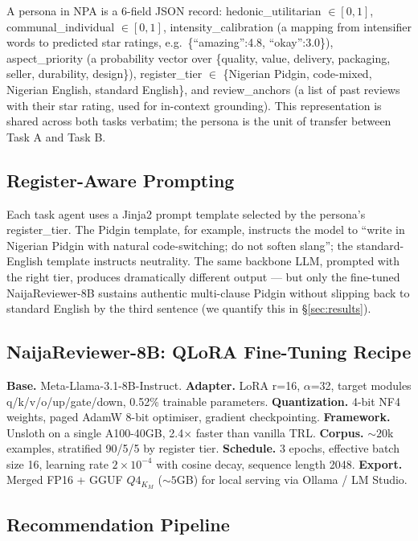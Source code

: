 \documentclass[sigconf,nonacm,balance]{acmart}
\begin{document}
A persona in NPA is a 6-field JSON record:
\textsf{hedonic\_utilitarian} \(\in [0,1]\),
\textsf{communal\_individual} \(\in [0,1]\),
\textsf{intensity\_calibration} (a mapping from intensifier words to predicted
star ratings, e.g.\ \textsf{\{``amazing'':4.8, ``okay'':3.0\}}),
\textsf{aspect\_priority} (a probability vector over
\{quality, value, delivery, packaging, seller, durability, design\}),
\textsf{register\_tier} \(\in\) \{Nigerian Pidgin, code-mixed,
Nigerian English, standard English\}, and
\textsf{review\_anchors} (a list of past reviews with their star rating, used
for in-context grounding).  This representation is shared across both tasks
verbatim; the persona is the unit of transfer between Task A and Task B.

\subsection{Register-Aware Prompting}

Each task agent uses a Jinja2 prompt template selected by the persona's
\textsf{register\_tier}. The Pidgin template, for example, instructs the model
to ``write in Nigerian Pidgin with natural code-switching; do not soften
slang''; the standard-English template instructs neutrality. The same
backbone LLM, prompted with the right tier, produces dramatically different
output --- but only the fine-tuned NaijaReviewer-8B sustains authentic
multi-clause Pidgin without slipping back to standard English by the third
sentence (we quantify this in \S\ref{sec:results}).

\subsection{NaijaReviewer-8B: QLoRA Fine-Tuning Recipe}

\textbf{Base.} Meta-Llama-3.1-8B-Instruct.
\textbf{Adapter.} LoRA r=16, \(\alpha\)=32, target modules q/k/v/o/up/gate/down,
0.52\% trainable parameters.
\textbf{Quantization.} 4-bit NF4 weights, paged AdamW 8-bit optimiser,
gradient checkpointing.
\textbf{Framework.} Unsloth on a single A100-40GB, 2.4\(\times\) faster than vanilla TRL.
\textbf{Corpus.} \(\sim\!20\)k examples, stratified 90/5/5 by register tier.
\textbf{Schedule.} 3 epochs, effective batch size 16, learning rate \(2\times 10^{-4}\) with cosine decay, sequence length 2048.
\textbf{Export.} Merged FP16 + GGUF \(Q4_K_M\) (\(\sim\!5\)GB) for local serving via Ollama / LM Studio.

\subsection{Recommendation Pipeline}
\end{document}
